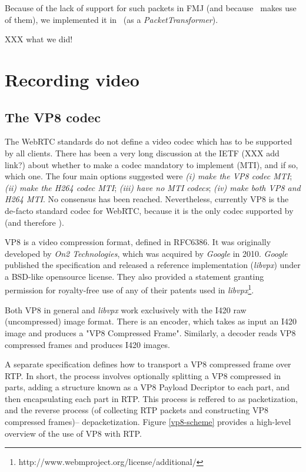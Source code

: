 \documentclass[twoside,openright,a4paper,12pt,english]{article}
\begin{document}
Because of the lack of support for such packets in FMJ (and because \wrtc\
makes use of them), we implemented it in \lj\ (as a \emph{PacketTransformer}).

XXX what we did!
\section{Recording video}
\label{recording-video}
\subsection{The VP8 codec}
The WebRTC standards do not define a video codec which has to be supported by all clients. There
has been a very long discussion at the IETF
(XXX add link?)
about whether to make a codec mandatory to implement (MTI), and if so, which one. The
four main options suggested were
\emph{(i) make the VP8 codec MTI};
\emph{(ii) make the H264 codec MTI};
\emph{(iii) have no MTI codecs};
\emph{(iv) make both VP8 and H264 MTI}. No consensus has been reached.
Nevertheless, currently VP8 is the de-facto standard codec for WebRTC, because
it is the only codec supported by \wrtc (and therefore \jm).


VP8 is a video compression format, defined in RFC6386\cite{vp8}. It was
originally developed by \emph{On2 Technologies}, which was acquired by
\emph{Google} in 2010. \emph{Google} published the specification and released a
reference implementation (\emph{libvpx}) under a BSD-like opensource
license. They also provided a statement granting permission for royalty-free
use of any of their patents used in
\emph{libvpx}\footnote{http://www.webmproject.org/license/additional/}.


Both VP8 in general and \emph{libvpx} work exclusively with the I420 raw
(uncompressed) image format\cite{i420}.
There is an encoder, which takes as input an I420 image and produces a "VP8
Compressed Frame". Similarly, a decoder reads VP8 compressed frames and
produces I420 images.

A separate specification\cite{vp8rtp} defines how to transport a VP8 compressed
frame over RTP. In short, the process involves optionally splitting a VP8
compressed in parts, adding a structure known as a VP8 Payload Decriptor to
each part, and then encapsulating each part in RTP. This process is reffered to
as packetization, and the reverse process (of collecting RTP packets and
constructing VP8 compressed frames)-- depacketization. Figure \ref{vp8-scheme}
provides a high-level overview of the use of VP8 with RTP.
\end{document}
